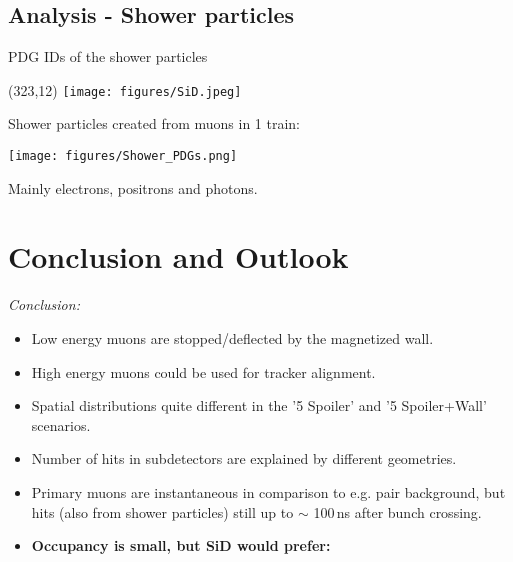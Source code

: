 \documentclass[xcolor={dvipsnames}]{beamer}
\newcommand{\sidlogo}{
  \setlength{\TPHorizModule}{1pt}
  \setlength{\TPVertModule}{1pt}
  \begin{textblock}{1}(323,12)
   \texttt{[image: figures/SiD.jpeg]}
  \end{textblock}
  }
\begin{document}
\subsection{Analysis - Shower particles}
\begin{frame}{PDG IDs of the shower particles}
\sidlogo
Shower particles created from muons in 1 train:
 \begin{center}
\texttt{[image: figures/Shower\_PDGs.png]}
\end{center}
Mainly electrons, positrons and photons.
\end{frame}

\section{Conclusion and Outlook}
\begin{frame}
\textit{Conclusion:}
\begin{itemize}
\item Low energy muons are stopped/deflected by the magnetized wall.
\item High energy muons could be used for tracker alignment.
\item Spatial distributions quite different in the '5 Spoiler' and '5 Spoiler+Wall' scenarios.
\item Number of hits in subdetectors are explained by different geometries.
\item Primary muons are instantaneous in comparison to e.g. pair background, but hits (also from shower particles) still up to $\sim$ 100\,ns after bunch crossing.
\item \textbf{\alert{Occupancy is small, but SiD would prefer:}}
\end{itemize}
\end{frame}
\end{document}
